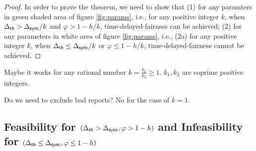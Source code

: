 {\begin{proof}
    In order to prove the theorem, we need to show that (1) for any paramters in green shaded area of figure \ref{fig:params}, i.e., for any positive integer $k$, when $\Delta_{\mathsf{th}}>\Delta_{\mathsf{sync}}/k$ and $\varphi>1-h/k$, time-delayed-fairness can be achieved; (2) for any parameters in white area of figure \ref{fig:params}, i.e., (2a) for any positive integer $k$, when $\Delta_{\mathsf{th}}\leq \Delta_{\mathsf{sync}}/k$ or $\varphi\leq 1-h/k$, time-delayed-fairness cannot be achieved.
\end{proof}

Maybe it works for any rational number $k=\frac{k_1}{k_2}\ge1$. $k_1,k_2$ are coprime positive integers. 


Do we need to exclude bad reports?  No for the case of $k=1$. 


\subsection{Feasibility for $(\Delta_{\mathsf{th}}>\Delta_{\mathsf{sync}}, \varphi>1-h)$ and Infeasibility for $(\Delta_{\mathsf{th}}\leq \Delta_{\mathsf{sync}}, \varphi\leq 1-h)$}

}